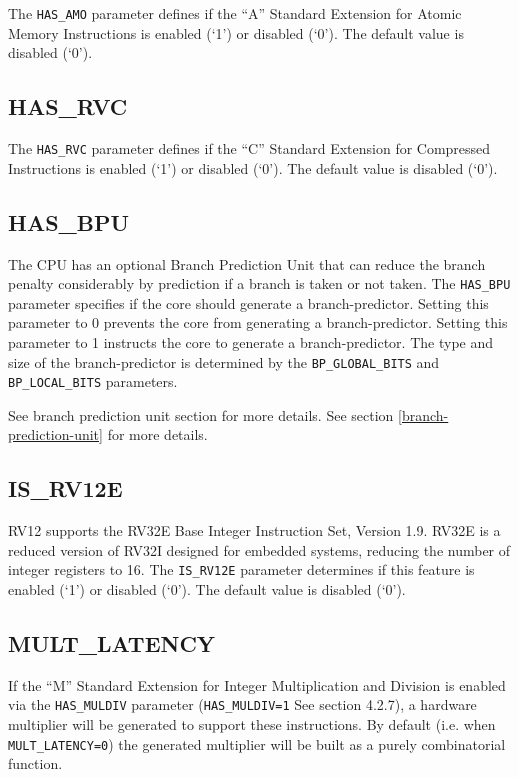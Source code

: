 The \texttt{HAS\_AMO} parameter defines if the ``A'' Standard Extension for
Atomic Memory Instructions is enabled (`1') or disabled (`0'). The
default value is disabled (`0').

\subsection{HAS\_RVC}\label{has_rvc}

The \texttt{HAS\_RVC} parameter defines if the ``C'' Standard Extension for
Compressed Instructions is enabled (`1') or disabled (`0'). The default
value is disabled (`0').

\subsection{HAS\_BPU}\label{has_bpu}

The CPU has an optional Branch Prediction Unit that can reduce the
branch penalty considerably by prediction if a branch is taken or not
taken. The \texttt{HAS\_BPU} parameter specifies if the core should generate a
branch-predictor. Setting this parameter to 0 prevents the core from
generating a branch-predictor. Setting this parameter to 1 instructs the
core to generate a branch-predictor. The type and size of the
branch-predictor is determined by the \texttt{BP\_GLOBAL\_BITS} and
\texttt{BP\_LOCAL\_BITS} parameters.

\ifdefined\MARKDOWN
See branch prediction unit section for more details.
\else
See section \ref{branch-prediction-unit}  for more details.
\fi

\subsection{IS\_RV12E}\label{is_rv12e}

RV12 supports the RV32E Base Integer Instruction Set, Version 1.9. RV32E
is a reduced version of RV32I designed for embedded systems, reducing
the number of integer registers to 16. The \texttt{IS\_RV12E} parameter
determines if this feature is enabled (`1') or disabled (`0'). The
default value is disabled (`0').

\subsection{MULT\_LATENCY}\label{mult_latency}

If the ``M'' Standard Extension for Integer Multiplication and Division
is enabled via the \texttt{HAS\_MULDIV} parameter (\texttt{HAS\_MULDIV=1} See section
4.2.7), a hardware multiplier will be generated to support these
instructions. By default (i.e. when \texttt{MULT\_LATENCY=0}) the generated multiplier will
be built as a purely combinatorial function.

